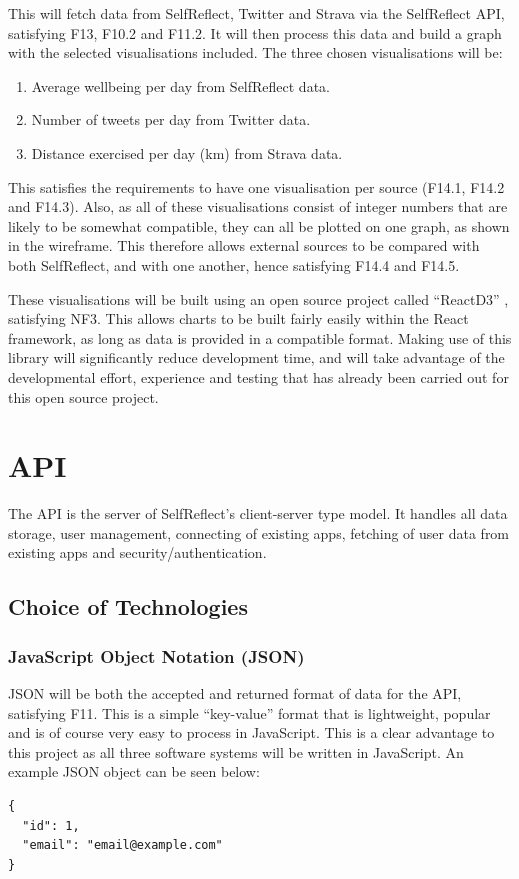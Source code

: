\documentclass[11pt,openright,a4paper]{report}
\begin{document}
\newpage
This will fetch data from SelfReflect, Twitter and Strava via the SelfReflect API, satisfying F13, F10.2 and F11.2. It will then process this data and build a graph with the selected visualisations included. The three chosen visualisations will be:
\begin{enumerate}
\item Average wellbeing per day from SelfReflect data.
\item Number of tweets per day from Twitter data.
\item Distance exercised per day (km) from Strava data.
\end{enumerate}

This satisfies the requirements to have one visualisation per source (F14.1, F14.2 and F14.3). Also, as all of these visualisations consist of integer numbers that are likely to be somewhat compatible, they can all be plotted on one graph, as shown in the wireframe. This therefore allows external sources to be compared with both SelfReflect, and with one another, hence satisfying F14.4 and F14.5.

These visualisations will be built using an open source project called \enquote{ReactD3} \parencite{reactd3}, satisfying NF3. This allows charts to be built fairly easily within the React framework, as long as data is provided in a compatible format. Making use of this library will significantly reduce development time, and will take advantage of the developmental effort, experience and testing that has already been carried out for this open source project.

\section{API} \label{sec:apidesign}
The API is the server of SelfReflect's client-server type model. It handles all data storage, user management, connecting of existing apps, fetching of user data from existing apps and security/authentication.

\subsection{Choice of Technologies}
\subsubsection{JavaScript Object Notation (JSON)}
JSON will be both the accepted and returned format of data for the API, satisfying F11. This is a simple \enquote{key-value} format that is lightweight, popular and is of course very easy to process in JavaScript. This is a clear advantage to this project as all three software systems will be written in JavaScript. An example JSON object can be seen below:
\begin{lstlisting}
{
  "id": 1,
  "email": "email@example.com"
}
\end{lstlisting}
\end{document}
